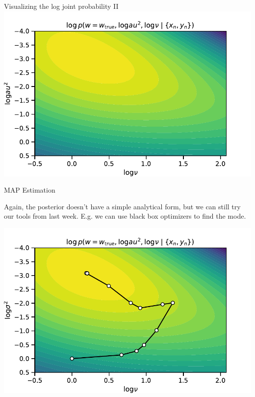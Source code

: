 \documentclass[aspectratio=169]{beamer}
\begin{document}
\begin{frame}{Visualizing the log joint probability II}
\centering
\includegraphics[width=.7\textwidth]{figures/lap3/robust_post.pdf}
\end{frame}

\begin{frame}{MAP Estimation}

Again, the posterior doesn't have a simple analytical form, but we can still try our tools from last week. E.g. we can use black box optimizers to find the mode.

\centering
\includegraphics[width=.7\textwidth]{figures/lap3/robust_post2.pdf}
    
\end{frame}
\end{document}
